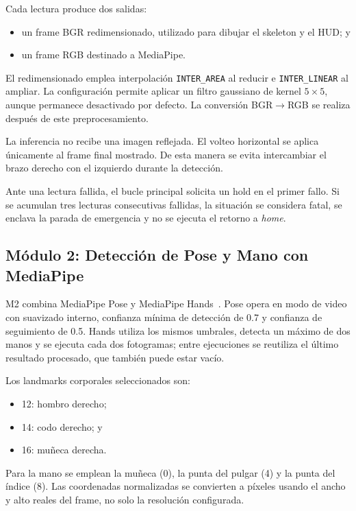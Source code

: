 Cada lectura produce dos salidas:

\begin{itemize}
    \item un frame BGR redimensionado, utilizado para dibujar el skeleton y el
    HUD; y
    \item un frame RGB destinado a MediaPipe.
\end{itemize}

El redimensionado emplea interpolación \texttt{INTER\_AREA} al reducir e
\texttt{INTER\_LINEAR} al ampliar. La configuración permite aplicar un filtro
gaussiano de kernel $5\times5$, aunque permanece desactivado por defecto. La
conversión BGR$\rightarrow$RGB se realiza después de este preprocesamiento.

La inferencia no recibe una imagen reflejada. El volteo horizontal se aplica
únicamente al frame final mostrado. De esta manera se evita intercambiar el
brazo derecho con el izquierdo durante la detección.

Ante una lectura fallida, el bucle principal solicita un hold en el primer
fallo. Si se acumulan tres lecturas consecutivas fallidas, la situación se
considera fatal, se enclava la parada de emergencia y no se ejecuta el retorno
a \textit{home}.

\subsection{Módulo 2: Detección de Pose y Mano con MediaPipe}
\label{subsec:implementacion_m2}

M2 combina MediaPipe Pose y MediaPipe Hands~\cite{Bazarevskyetal2020,
Lugaresietal2019}. Pose opera en modo de video con suavizado interno, confianza
mínima de detección de 0.7 y confianza de seguimiento de 0.5. Hands utiliza los
mismos umbrales, detecta un máximo de dos manos y se ejecuta cada dos
fotogramas; entre ejecuciones se reutiliza el último resultado procesado, que
también puede estar vacío.

Los landmarks corporales seleccionados son:

\begin{itemize}
    \item 12: hombro derecho;
    \item 14: codo derecho; y
    \item 16: muñeca derecha.
\end{itemize}

Para la mano se emplean la muñeca (0), la punta del pulgar (4) y la punta del
índice (8). Las coordenadas normalizadas se convierten a píxeles usando el
ancho y alto reales del frame, no solo la resolución configurada.

